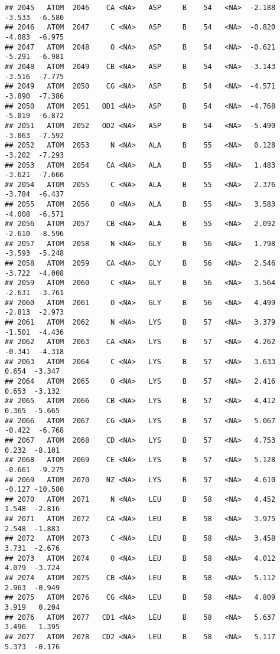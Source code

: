 \documentclass[
]{article}
\begin{document}
\begin{verbatim}
## 2045   ATOM  2046    CA <NA>   ASP     B    54   <NA>  -2.188  -3.533  -6.580
## 2046   ATOM  2047     C <NA>   ASP     B    54   <NA>  -0.820  -4.083  -6.975
## 2047   ATOM  2048     O <NA>   ASP     B    54   <NA>  -0.621  -5.291  -6.981
## 2048   ATOM  2049    CB <NA>   ASP     B    54   <NA>  -3.143  -3.516  -7.775
## 2049   ATOM  2050    CG <NA>   ASP     B    54   <NA>  -4.571  -3.890  -7.386
## 2050   ATOM  2051   OD1 <NA>   ASP     B    54   <NA>  -4.768  -5.019  -6.872
## 2051   ATOM  2052   OD2 <NA>   ASP     B    54   <NA>  -5.490  -3.063  -7.592
## 2052   ATOM  2053     N <NA>   ALA     B    55   <NA>   0.128  -3.202  -7.293
## 2053   ATOM  2054    CA <NA>   ALA     B    55   <NA>   1.483  -3.621  -7.666
## 2054   ATOM  2055     C <NA>   ALA     B    55   <NA>   2.376  -3.784  -6.437
## 2055   ATOM  2056     O <NA>   ALA     B    55   <NA>   3.583  -4.008  -6.571
## 2056   ATOM  2057    CB <NA>   ALA     B    55   <NA>   2.092  -2.610  -8.596
## 2057   ATOM  2058     N <NA>   GLY     B    56   <NA>   1.798  -3.593  -5.248
## 2058   ATOM  2059    CA <NA>   GLY     B    56   <NA>   2.546  -3.722  -4.008
## 2059   ATOM  2060     C <NA>   GLY     B    56   <NA>   3.564  -2.631  -3.761
## 2060   ATOM  2061     O <NA>   GLY     B    56   <NA>   4.499  -2.813  -2.973
## 2061   ATOM  2062     N <NA>   LYS     B    57   <NA>   3.379  -1.501  -4.436
## 2062   ATOM  2063    CA <NA>   LYS     B    57   <NA>   4.262  -0.341  -4.318
## 2063   ATOM  2064     C <NA>   LYS     B    57   <NA>   3.633   0.654  -3.347
## 2064   ATOM  2065     O <NA>   LYS     B    57   <NA>   2.416   0.653  -3.132
## 2065   ATOM  2066    CB <NA>   LYS     B    57   <NA>   4.412   0.365  -5.665
## 2066   ATOM  2067    CG <NA>   LYS     B    57   <NA>   5.067  -0.422  -6.768
## 2067   ATOM  2068    CD <NA>   LYS     B    57   <NA>   4.753   0.232  -8.101
## 2068   ATOM  2069    CE <NA>   LYS     B    57   <NA>   5.128  -0.661  -9.275
## 2069   ATOM  2070    NZ <NA>   LYS     B    57   <NA>   4.610  -0.127 -10.580
## 2070   ATOM  2071     N <NA>   LEU     B    58   <NA>   4.452   1.548  -2.816
## 2071   ATOM  2072    CA <NA>   LEU     B    58   <NA>   3.975   2.548  -1.883
## 2072   ATOM  2073     C <NA>   LEU     B    58   <NA>   3.458   3.731  -2.676
## 2073   ATOM  2074     O <NA>   LEU     B    58   <NA>   4.012   4.079  -3.724
## 2074   ATOM  2075    CB <NA>   LEU     B    58   <NA>   5.112   2.963  -0.949
## 2075   ATOM  2076    CG <NA>   LEU     B    58   <NA>   4.809   3.919   0.204
## 2076   ATOM  2077   CD1 <NA>   LEU     B    58   <NA>   5.637   3.496   1.395
## 2077   ATOM  2078   CD2 <NA>   LEU     B    58   <NA>   5.117   5.373  -0.176

\end{verbatim}
\end{document}
